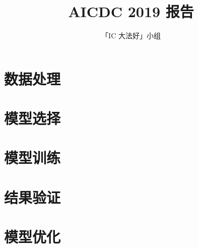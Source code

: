 \documentclass[11pt, oneside]{article}   	%
\title{AICDC 2019 报告}
\author{「IC 大法好」小组}
\begin{document}
\maketitle
\newpage
\tableofcontents
\newpage
\section{数据处理}

\section{模型选择}

\section{模型训练}

\section{结果验证}

\section{模型优化}
\end{document}
